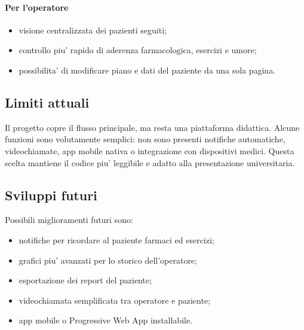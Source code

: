 \paragraph{Per l'operatore}
\begin{itemize}
    \item visione centralizzata dei pazienti seguiti;
    \item controllo piu' rapido di aderenza farmacologica, esercizi e umore;
    \item possibilita' di modificare piano e dati del paziente da una sola pagina.
\end{itemize}

\subsection{Limiti attuali}

Il progetto copre il flusso principale, ma resta una piattaforma didattica. Alcune funzioni sono
volutamente semplici: non sono presenti notifiche automatiche, videochiamate, app mobile nativa o
integrazione con dispositivi medici. Questa scelta mantiene il codice piu' leggibile e adatto alla
presentazione universitaria.

\subsection{Sviluppi futuri}

Possibili miglioramenti futuri sono:

\begin{itemize}
    \item notifiche per ricordare al paziente farmaci ed esercizi;
    \item grafici piu' avanzati per lo storico dell'operatore;
    \item esportazione dei report del paziente;
    \item videochiamata semplificata tra operatore e paziente;
    \item app mobile o Progressive Web App installabile.
\end{itemize}

\newpage
